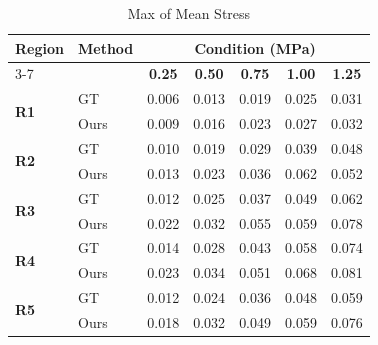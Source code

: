 \documentclass{article}
\begin{document}
\thispagestyle{empty}

\begin{table}[h]
\centering
\caption{Max of Mean Stress}
\vspace{0.3cm}
\begin{tabular}{llccccc}
\toprule
\textbf{Region} & \textbf{Method} & \multicolumn{5}{c}{\textbf{Condition (MPa)}} \\
\cmidrule(lr){3-7}
& & \textbf{0.25} & \textbf{0.50} & \textbf{0.75} & \textbf{1.00} & \textbf{1.25} \\
\midrule
\multirow{2}{*}{\textbf{R1}} & GT  & 0.006 & 0.013 & 0.019 & 0.025 & 0.031 \\
 & Ours  & 0.009 & 0.016 & 0.023 & 0.027 & 0.032 \\ \midrule
\multirow{2}{*}{\textbf{R2}} & GT  & 0.010 & 0.019 & 0.029 & 0.039 & 0.048 \\
 & Ours  & 0.013 & 0.023 & 0.036 & 0.062 & 0.052 \\ \midrule
\multirow{2}{*}{\textbf{R3}} & GT  & 0.012 & 0.025 & 0.037 & 0.049 & 0.062 \\
 & Ours  & 0.022 & 0.032 & 0.055 & 0.059 & 0.078 \\ \midrule
\multirow{2}{*}{\textbf{R4}} & GT  & 0.014 & 0.028 & 0.043 & 0.058 & 0.074 \\
 & Ours  & 0.023 & 0.034 & 0.051 & 0.068 & 0.081 \\ \midrule
\multirow{2}{*}{\textbf{R5}} & GT  & 0.012 & 0.024 & 0.036 & 0.048 & 0.059 \\
 & Ours  & 0.018 & 0.032 & 0.049 & 0.059 & 0.076 \\
\bottomrule
\end{tabular}
\end{table}
\end{document}
